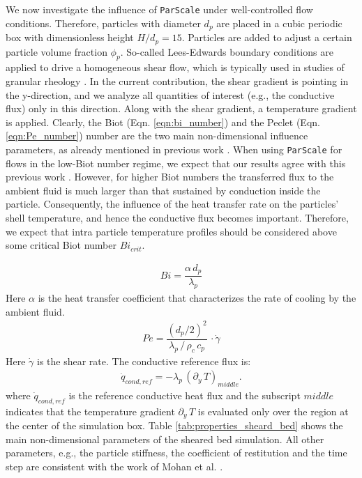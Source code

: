 \documentclass{particles2015}
\begin{document}
We now investigate the influence of \texttt{ParScale} under well-controlled flow conditions. Therefore, particles with diameter $d_p$ are placed in a cubic periodic box with dimensionless height $H/d_p = 15$. Particles are added to adjust a certain particle volume fraction $\phi_p$. So-called Lees-Edwards boundary conditions are applied to drive a homogeneous shear flow, which is typically used in studies of granular rheology \cite{Chialvo2012}. In the current contribution, the shear gradient is pointing in the y-direction, and we analyze all quantities of interest (e.g., the conductive flux) only in this direction. Along with the shear gradient, a temperature gradient is applied. Clearly, the  Biot (Eqn. \ref{eqn:bi_number}) and the Peclet (Eqn. \ref{eqn:Pe_number}) number are the two main non-dimensional influence parameters, as already mentioned in previous work \cite{Mohan2014}. When using \texttt{ParScale} for flows in the low-Biot number regime, we expect that our results agree with this previous work \cite{Mohan2014}. However, for higher Biot numbers the transferred flux to the ambient fluid is much larger than that sustained by conduction inside the particle. Consequently, the influence of the heat transfer rate on the particles' shell temperature, and hence the conductive flux becomes important. Therefore, we expect that intra particle temperature profiles should be considered above some critical Biot number $Bi_{crit}$.

\begin{align}
Bi = \dfrac{\alpha\, d_p}{\lambda_p}
\label{eqn:bi_number}
\end{align}
Here $\alpha$ is the heat transfer coefficient that characterizes the rate of cooling by the ambient fluid.
\begin{align}
Pe = \dfrac{(d_p/2)^2}{\lambda_p \, /\, \rho_c \, c_p} \, \cdot \dot{\gamma}
\label{eqn:Pe_number}
\end{align}  
Here $\dot{\gamma}$ is the shear rate. The conductive reference flux is:
\begin{align}
\dot{q}_{cond,ref} = - \lambda_p \, (\partial_y \, T)_{middle}.
\end{align}
where $\dot{q}_{cond,ref}$ is the reference conductive heat flux and the subscript $middle$ indicates that the temperature gradient $\partial_y \, T$ is evaluated only over the region at the center of the simulation box. Table \ref{tab:properties_sheard_bed} shows the main non-dimensional parameters of the sheared bed simulation.  All other parameters, e.g., the particle stiffness, the coefficient of restitution and the time step are consistent with the work of Mohan et al. \cite{Mohan2014}.
\end{document}
